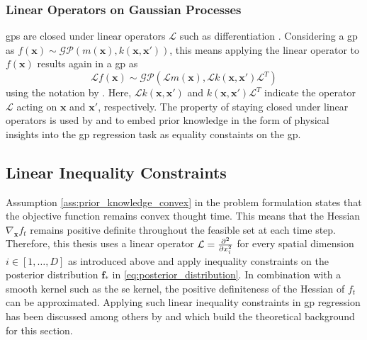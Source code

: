 \subsubsection{Linear Operators on Gaussian Processes}
\label{sec:linear_operator}

\glspl{gp} are closed under linear operators $\mathcal{L}$ such as differentiation \cite{Rasmussen_2006}. Considering a \gls{gp} as $f(\mathbf{x}) \sim \mathcal{GP}\left(m(\mathbf{x}),k(\mathbf{x}, \mathbf{x}')\right)$, this means applying the linear operator to $f(\mathbf{x})$ results again in a \gls{gp} as
\begin{equation}
    \mathcal{L}f(\mathbf{x}) \sim \mathcal{GP}\left(\mathcal{L}m(\mathbf{x}),\mathcal{L}k(\mathbf{x}, \mathbf{x}')\mathcal{L}^T\right)
\end{equation}
using the notation by \textcite{Agrell_2019}. Here, $\mathcal{L}k(\mathbf{x}, \mathbf{x}')$ and $k(\mathbf{x}, \mathbf{x}')\mathcal{L}^T$ indicate the operator $\mathcal{L}$ acting on $\mathbf{x}$ and $\mathbf{x}'$, respectively. The property of staying closed under linear operators is used by \textcite{Geist_2020} and \textcite{Jidling_2017} to embed prior knowledge in the form of physical insights into the \gls{gp} regression task as equality constaints on the \gls{gp}.


\subsection{Linear Inequality Constraints}
\label{sec:linear_constraints}

Assumption \ref{ass:prior_knowledge_convex} in the problem formulation states that the objective function remains convex thought time. This means that the Hessian $\nabla_{\mathbf{x}} f_t$ remains positive definite throughout the feasible set at each time step. Therefore, this thesis uses a linear operator $\mathcal{L} = \frac{\partial^2}{\partial x_i^2}$ for every spatial dimension $i\in [1,\dots,D]$ as introduced above and apply inequality constraints on the posterior distribution $\mathbf{f}_*$ in \eqref{eq:posterior_distribution}. In combination with a smooth kernel such as the \gls{se} kernel, the positive definiteness of the Hessian of $f_t$ can be approximated. Applying such linear inequality constraints in \gls{gp} regression has been discussed among others by \textcite{Agrell_2019} and \textcite{Wang_2016} which build the theoretical background for this section.

